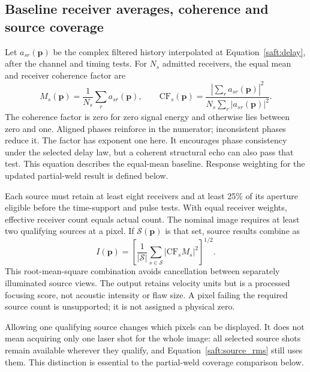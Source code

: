 \documentclass[11pt]{article}
\begin{document}
\subsection{Baseline receiver averages, coherence and source coverage}
Let $a_{sr}(\mathbf p)$ be the complex filtered history interpolated at Equation~\ref{saft:delay}, after the channel and timing tests. For $N_s$ admitted receivers, the equal mean and receiver coherence factor are
\begin{equation}
 M_s(\mathbf p)=\frac{1}{N_s}\sum_r a_{sr}(\mathbf p),\qquad
 \mathrm{CF}_s(\mathbf p)=\frac{|\sum_r a_{sr}(\mathbf p)|^2}
 {N_s\sum_r|a_{sr}(\mathbf p)|^2}.
\label{saft:cf}
\end{equation}
The coherence factor is zero for zero signal energy and otherwise lies between zero and one. Aligned phases reinforce in the numerator; inconsistent phases reduce it. The factor has exponent one here. It encourages phase consistency under the selected delay law, but a coherent structural echo can also pass that test. This equation describes the equal-mean baseline. Response weighting for the updated partial-weld result is defined below.

Each source must retain at least eight receivers and at least 25\% of its aperture eligible before the time-support and pulse tests. With equal receiver weights, effective receiver count equals actual count. The nominal image requires at least two qualifying sources at a pixel. If $\mathcal S(\mathbf p)$ is that set, source results combine as
\begin{equation}
 I(\mathbf p)=\left[\frac{1}{|\mathcal S|}\sum_{s\in\mathcal S}
                 |\mathrm{CF}_s M_s|^2\right]^{1/2}.
\label{saft:source_rms}
\end{equation}
This root-mean-square combination avoids cancellation between separately illuminated source views. The output retains velocity units but is a processed focusing score, not acoustic intensity or flaw size. A pixel failing the required source count is unsupported; it is not assigned a physical zero.

Allowing one qualifying source changes which pixels can be displayed. It does not mean acquiring only one laser shot for the whole image: all selected source shots remain available wherever they qualify, and Equation~\ref{saft:source_rms} still uses them. This distinction is essential to the partial-weld coverage comparison below.
\end{document}
